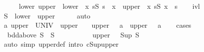 \begin{isabellebody}
%
\isadelimproof
%
\endisadelimproof
%
\isatagproof
{}\isamarkupfalse%
\ {\isacharminus}{\kern0pt}\isanewline
\ \ \isamarkupfalse%
\ lower\ upper\ \ {\isachardoublequoteopen}lower\ {\isacharequal}{\kern0pt}\ {\isacharbraceleft}{\kern0pt}x{\isachardot}{\kern0pt}\ {\isasymexists}s{\isasymin}S{\isachardot}{\kern0pt}\ s\ {\isasymle}\ x{\isacharbraceright}{\kern0pt}{\isachardoublequoteclose}\ \ {\isachardoublequoteopen}upper\ {\isacharequal}{\kern0pt}\ {\isacharbraceleft}{\kern0pt}x{\isachardot}{\kern0pt}\ {\isasymexists}s{\isasymin}S{\isachardot}{\kern0pt}\ x\ {\isasymle}\ s{\isacharbraceright}{\kern0pt}{\isachardoublequoteclose}\isanewline
\ \ \isamarkupfalse%
\ ivl\ \isamarkupfalse%
\ {\isachardoublequoteopen}S\ {\isacharequal}{\kern0pt}\ lower\ {\isasyminter}\ upper{\isachardoublequoteclose}\isanewline
\ \ \ \ \isamarkupfalse%
\ auto\isanewline
\ \ \isamarkupfalse%
\isanewline
\ \ \isamarkupfalse%
\ {\isachardoublequoteopen}{\isasymexists}a{\isachardot}{\kern0pt}\ upper\ {\isacharequal}{\kern0pt}\ UNIV\ {\isasymor}\ upper\ {\isacharequal}{\kern0pt}\ {\isacharbraceleft}{\kern0pt}{\isacharbraceright}{\kern0pt}\ {\isasymor}\ upper\ {\isacharequal}{\kern0pt}\ {\isacharbraceleft}{\kern0pt}{\isachardot}{\kern0pt}{\isachardot}{\kern0pt}\ a{\isacharbraceright}{\kern0pt}\ {\isasymor}\ upper\ {\isacharequal}{\kern0pt}\ {\isacharbraceleft}{\kern0pt}{\isachardot}{\kern0pt}{\isachardot}{\kern0pt}{\isacharless}{\kern0pt}\ a{\isacharbraceright}{\kern0pt}{\isachardoublequoteclose}\isanewline
\ \ \isamarkupfalse%
\ cases\isanewline
\ \ \ \ \isamarkupfalse%
\ {\isacharasterisk}{\kern0pt}{\isacharcolon}{\kern0pt}\ {\isachardoublequoteopen}bdd{\isacharunderscore}{\kern0pt}above\ S\ {\isasymand}\ S\ {\isasymnoteq}\ {\isacharbraceleft}{\kern0pt}{\isacharbraceright}{\kern0pt}{\isachardoublequoteclose}\isanewline
\ \ \ \ \isamarkupfalse%
\ {\isacharasterisk}{\kern0pt}\ \isamarkupfalse%
\ {\isachardoublequoteopen}upper\ {\isasymsubseteq}\ {\isacharbraceleft}{\kern0pt}{\isachardot}{\kern0pt}{\isachardot}{\kern0pt}\ Sup\ S{\isacharbraceright}{\kern0pt}{\isachardoublequoteclose}\isanewline
\ \ \ \ \ \ \isamarkupfalse%
\ {\isacharparenleft}{\kern0pt}auto\ simp{\isacharcolon}{\kern0pt}\ upper{\isacharunderscore}{\kern0pt}def\ intro{\isacharcolon}{\kern0pt}\ cSup{\isacharunderscore}{\kern0pt}upper{}{\isacharparenright}{\kern0pt}\isanewline

\end{isabellebody}
